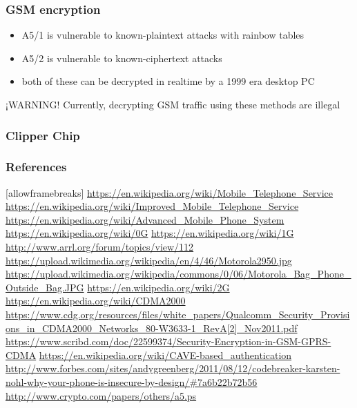 \documentclass{beamer}
\begin{document}
\begin{frame}
  \frametitle{GSM encryption}
  \begin{itemize}
    \item A5/1 is vulnerable to known-plaintext attacks with rainbow tables
    \item A5/2 is vulnerable to known-ciphertext attacks
    \item both of these can be decrypted in realtime by a 1999 era desktop PC
  \end{itemize}

  \begin{alertblock}{¡WARNING!}
    Currently, decrypting GSM traffic using these methods are illegal
  \end{alertblock}
\end{frame}

\begin{frame}
  \frametitle{Clipper Chip}
\end{frame}



\begin{frame}
  \frametitle{References}[allowframebreaks]
  \url{https://en.wikipedia.org/wiki/Mobile_Telephone_Service}
  \url{https://en.wikipedia.org/wiki/Improved_Mobile_Telephone_Service}
  \url{https://en.wikipedia.org/wiki/Advanced_Mobile_Phone_System}
  \url{https://en.wikipedia.org/wiki/0G}
  \url{https://en.wikipedia.org/wiki/1G}
  \url{http://www.arrl.org/forum/topics/view/112}
  \url{https://upload.wikimedia.org/wikipedia/en/4/46/Motorola2950.jpg}
  \url{https://upload.wikimedia.org/wikipedia/commons/0/06/Motorola_Bag_Phone_Outside_Bag.JPG}
  \url{https://en.wikipedia.org/wiki/2G}
  \url{https://en.wikipedia.org/wiki/CDMA2000}
  \url{https://www.cdg.org/resources/files/white_papers/Qualcomm_Security_Provisions_in_CDMA2000_Networks_80-W3633-1_RevA[2]_Nov2011.pdf}
  \url{https://www.scribd.com/doc/22599374/Security-Encryption-in-GSM-GPRS-CDMA}
  \url{https://en.wikipedia.org/wiki/CAVE-based_authentication}
  \url{http://www.forbes.com/sites/andygreenberg/2011/08/12/codebreaker-karsten-nohl-why-your-phone-is-insecure-by-design/\#7a6b22b72b56}
  \url{http://www.crypto.com/papers/others/a5.ps}
\end{frame}
\end{document}
